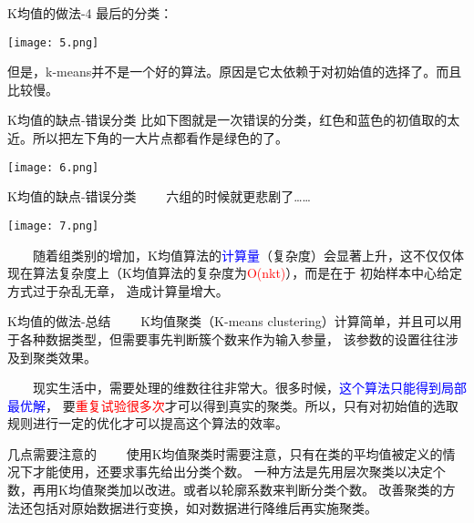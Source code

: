 \documentclass[cjk]{beamer}
\begin{document}
\begin{CJK*}{GBK}{kai}
\begin{frame}{K均值的做法-4}
  最后的分类：
\begin{center}
  \texttt{[image: 5.png]}
  \end{center}
  但是，k-means并不是一个好的算法。原因是它太依赖于对初始值的选择了。而且比较慢。
\end{frame}

\begin{frame}{K均值的缺点-错误分类}
  比如下图就是一次错误的分类，红色和蓝色的初值取的太近。所以把左下角的一大片点都看作是绿色的了。
\begin{center}
  \texttt{[image: 6.png]}
\end{center}
\end{frame}

\begin{frame}{K均值的缺点-错误分类}
  \ \ \ \ 六组的时候就更悲剧了……
\begin{center}
  \texttt{[image: 7.png]}
\end{center}
\end{frame}
\begin{frame}
\ \ \ \ 随着组类别的增加，K均值算法的\textcolor{blue}{计算量}（复杂度）会显著上升，这不仅仅体现在算法复杂度上（K均值算法的复杂度为\textcolor{red}{O(nkt)}），而是在于
初始样本中心给定方式过于杂乱无章， 造成计算量增大。
\end{frame}

\begin{frame}{K均值的做法-总结}
  \ \ \ \ K均值聚类（K-means clustering）计算简单，并且可以用于各种数据类型，但需要事先判断簇个数来作为输入参量，
  该参数的设置往往涉及到聚类效果。

  \ \ \ \ 现实生活中，需要处理的维数往往非常大。很多时候，\textcolor{blue}{这个算法只能得到局部最优解}，
  要\textcolor{red}{重复试验很多次}才可以得到真实的聚类。所以，只有对初始值的选取规则进行一定的优化才可以提高这个算法的效率。
\end{frame}





\begin{frame}{几点需要注意的}
\ \ \ \ 使用K均值聚类时需要注意，只有在类的平均值被定义的情况下才能使用，还要求事先给出分类个数。
一种方法是先用层次聚类以决定个数，再用K均值聚类加以改进。或者以轮廓系数来判断分类个数。
改善聚类的方法还包括对原始数据进行变换，如对数据进行降维后再实施聚类。


\end{frame}
\end{CJK*}
\end{document}
